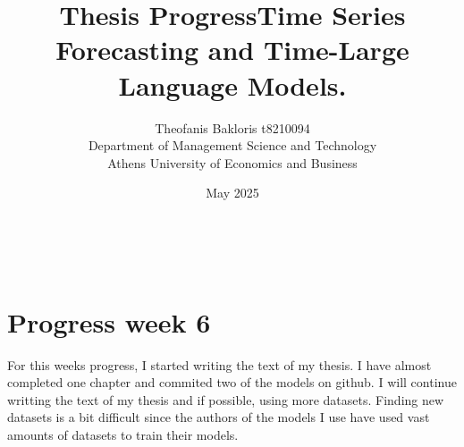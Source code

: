 \documentclass{article}
\title{\textbf{Thesis Progress}}
\author{Theofanis Bakloris t8210094\\
Department of Management Science and Technology\\
Athens University of Economics and Business}
\date{May 2025}
\begin{document}

\maketitle

\title{\textbf{Time Series Forecasting and Time-Large Language Models.}}
\\

\section*{Progress week 6}

For this weeks progress, I started writing the text of my thesis. I have almost completed one chapter and commited two of the models on github. I will continue writting the text of my thesis and if possible, using more datasets. Finding new datasets is a bit difficult since the authors of the models I use have used vast amounts of datasets to train their models. 





\nocite{*}
\end{document}
